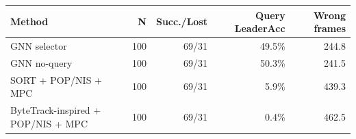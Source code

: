 \begin{tabular}{lrrrr}
\toprule
\textbf{Method} & \textbf{N} & \textbf{Succ./Lost} & \textbf{Query LeaderAcc} & \textbf{Wrong frames} \\
\midrule
GNN selector & 100 & 69/31 & 49.5\% & 244.8 \\
GNN no-query & 100 & 69/31 & 50.3\% & 241.5 \\
SORT + POP/NIS + MPC & 100 & 69/31 & 5.9\% & 439.3 \\
ByteTrack-inspired + POP/NIS + MPC & 100 & 69/31 & 0.4\% & 462.5 \\
\bottomrule
\end{tabular}
